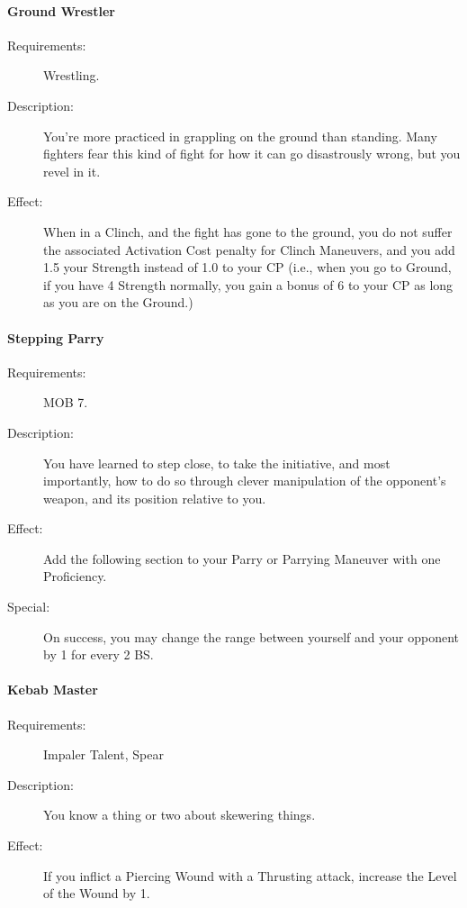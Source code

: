 \documentclass[oneside,11pt,english]{book}
\begin{document}
\paragraph{\label{talent:Ground Wrestler}Ground Wrestler}
	\begin{description}
		\item [Requirements:] Wrestling. 
		\item [Description:] You’re more practiced in grappling on the ground than standing. Many fighters fear this 
kind of fight for how it can go disastrously wrong, but you revel in it. 
		\item [Effect:] When in a Clinch, and the fight has gone to the ground, you do not suffer the associated 
Activation Cost penalty for Clinch Maneuvers, and you add 1.5 your Strength instead of 1.0 to your CP 
(i.e., when you go to Ground, if you have 4 Strength normally, you gain a bonus of 6 to your CP as long 
as you are on the Ground.) 

	\end{description}
\paragraph{\label{talent:Stepping Parry}Stepping Parry}
	\begin{description}
		\item [Requirements:] MOB 7. 
		\item [Description:] You have learned to step close, to take the initiative, and most importantly, how to do so 
through clever manipulation of the opponent’s weapon, and its position relative to you. 
		\item [Effect:] Add the following section to your Parry or Parrying Maneuver with one Proficiency. 
		\item [Special:] On success, you may change the range between yourself and your opponent by 1 for every 2 BS.

	\end{description}
\paragraph{\label{talent:Kebab Master}Kebab Master}
	\begin{description}
		\item [Requirements:] Impaler Talent, Spear 
		\item [Description:] You know a thing or two about skewering things. 
		\item [Effect:] If you inflict a Piercing Wound with a Thrusting attack, increase the Level of the Wound by 1. 

	\end{description}
\end{document}
